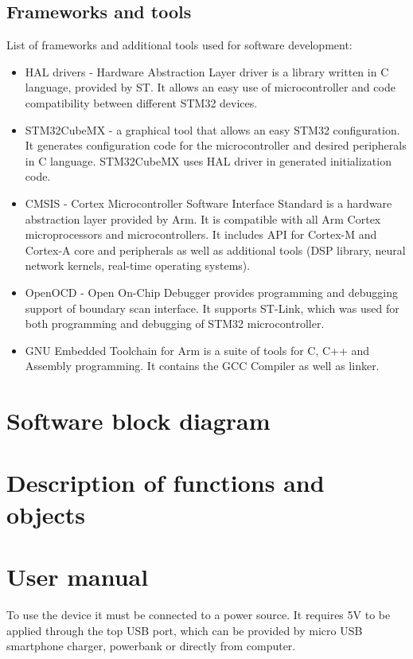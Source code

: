 \documentclass[a4paper,twoside,12pt]{book}
\begin{document}
\subsection{Frameworks and tools}
List of frameworks and additional tools used for software development:

\begin{itemize}
    \item HAL drivers
    - Hardware Abstraction Layer driver is a library written in C language, provided by ST.
    It allows an easy use of microcontroller and code compatibility between different STM32 devices.
    \item STM32CubeMX
    - a graphical tool that allows an easy STM32 configuration.
    It generates configuration code for the microcontroller and desired peripherals in C language.
    STM32CubeMX uses HAL driver in generated initialization code.
    \item CMSIS
    - Cortex Microcontroller Software Interface Standard
    is a hardware abstraction layer provided by Arm.
    It is compatible with all Arm Cortex microprocessors and microcontrollers.
    It includes API for Cortex-M and Cortex-A core and peripherals as well as additional tools
    (DSP library, neural network kernels, real-time operating systems).
    \item OpenOCD
    - Open On-Chip Debugger provides programming and debugging support of boundary scan interface.
    It supports ST-Link, which was used for both programming and debugging of STM32 microcontroller.
    \item GNU Embedded Toolchain for Arm
    is a suite of tools for C, C++ and Assembly programming.
    It contains the GCC Compiler as well as linker.
\end{itemize}

\section{Software block diagram}

\section{Description of functions and objects}

\section{User manual}
To use the device it must be connected to a power source.
It requires 5V to be applied through the top USB port,
which can be provided by micro USB smartphone charger,
powerbank or directly from computer.
\end{document}
